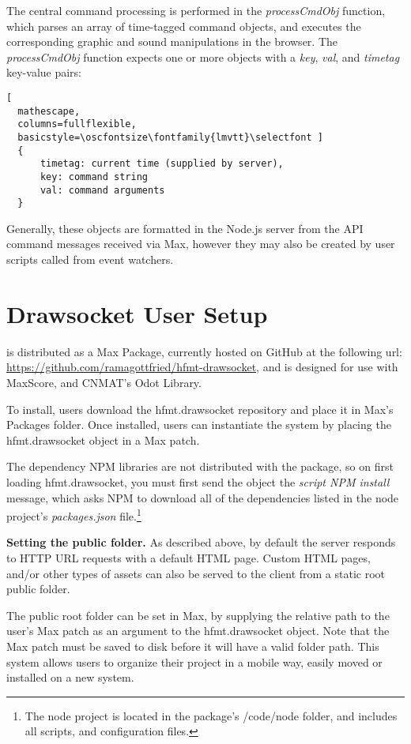 The central command processing is performed in the \textit{processCmdObj} function, which parses an array of time-tagged command objects, and executes the corresponding graphic and sound manipulations in the browser. The \textit{processCmdObj} function expects one or more objects with a \textit{key}, \textit{val}, and \textit{timetag} key-value pairs:

\begin{lstlisting}[
  mathescape,
  columns=fullflexible,
  basicstyle=\oscfontsize\fontfamily{lmvtt}\selectfont ]
  {
      timetag: current time (supplied by server),
      key: command string
      val: command arguments
  }
\end{lstlisting}
\noindent
Generally, these objects are formatted in the Node.js server from the API command messages received via Max, however they may also be created by user scripts called from event watchers.

\section{Drawsocket User Setup}\label{sec:setup}
\drawsocket is distributed as a Max Package, currently hosted on GitHub at the following url: \url{https://github.com/ramagottfried/hfmt-drawsocket}, and is designed for use with MaxScore, and CNMAT's Odot Library.

To install, users download the hfmt.drawsocket repository and place it in Max's Packages folder. Once installed, users can instantiate the \drawsocket system by placing the hfmt.drawsocket object in a Max patch.

The dependency NPM libraries are not distributed with the package, so on first loading hfmt.drawsocket, you must first send the object the \textit{script NPM install} message, which asks NPM to download all of the dependencies listed in the node project's \textit{packages.json} file.\footnote{The node project is located in the package's /code/node folder, and includes all scripts, and configuration files.}

\medskip
\noindent
\textbf{Setting the public folder.}  As described above, by default the \drawsocket server responds to HTTP URL requests with a default HTML page. Custom HTML pages, and/or other types of assets can also be served to the client from a static root public folder. 

The public root folder can be set in Max, by supplying the relative path to the user's Max patch as an argument to the hfmt.drawsocket object.
Note that the Max patch must be saved to disk before it will have a valid folder path.
This system allows users to organize their project in a mobile way, easily moved or installed on a new system.

